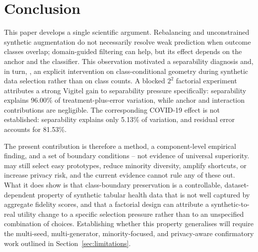 \section{Conclusion}
\label{sec:conclusion}

This paper develops a single scientific argument. Rebalancing and unconstrained synthetic augmentation do not necessarily resolve weak prediction when outcome classes overlap; domain-guided filtering can help, but its effect depends on the anchor and the classifier. This observation motivated a separability diagnosis and, in turn, \sepa{}, an explicit intervention on class-conditional geometry during synthetic data selection rather than on class counts. A blocked $2^2$ factorial experiment attributes a strong Vigitel \tstr{} gain to separability pressure specifically: separability explains 96.00\% of treatment-plus-error variation, while anchor and interaction contributions are negligible. The corresponding COVID-19 effect is not established: separability explains only 5.13\% of variation, and residual error accounts for 81.53\%.

The present contribution is therefore a method, a component-level empirical finding, and a set of boundary conditions -- not evidence of universal superiority. \sepa{} may still select easy prototypes, reduce minority diversity, amplify shortcuts, or increase privacy risk, and the current evidence cannot rule any of these out. What it does show is that class-boundary preservation is a controllable, dataset-dependent property of synthetic tabular health data that is not well captured by aggregate fidelity scores, and that a factorial design can attribute a synthetic-to-real utility change to a specific selection pressure rather than to an unspecified combination of choices. Establishing whether this property generalises will require the multi-seed, multi-generator, minority-focused, and privacy-aware confirmatory work outlined in Section~\ref{sec:limitations}.

